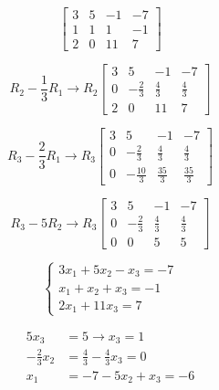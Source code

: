 \documentclass[answers]{exam} %
\begin{document}
\begin{questions}
\begin{enumerate}[label=\alph*.]
		      \begin{solution}
			      \[
				      \left[
					      \begin{array}{ccc|c}
						      3 & 5 & -1 & -7 \\
						      1 & 1 & 1  & -1 \\
						      2 & 0 & 11 & 7
					      \end{array}
					      \right]
			      \]

			      \[
				      R_2 - \frac{1}{3} R_1 \rightarrow R_2
				      \left[
					      \begin{array}{ccc|c}
						      3 & 5            & -1          & -7          \\
						      0 & -\frac{2}{3} & \frac{4}{3} & \frac{4}{3} \\
						      2 & 0            & 11          & 7
					      \end{array}
					      \right]
			      \]

			      \[
				      R_3 - \frac{2}{3} R_1 \rightarrow R_3
				      \left[
					      \begin{array}{ccc|c}
						      3 & 5             & -1           & -7           \\
						      0 & -\frac{2}{3}  & \frac{4}{3}  & \frac{4}{3}  \\
						      0 & -\frac{10}{3} & \frac{35}{3} & \frac{35}{3}
					      \end{array}
					      \right]
			      \]

			      \[
				      R_3 - 5 R_2 \rightarrow R_3
				      \left[
					      \begin{array}{ccc|c}
						      3 & 5            & -1          & -7          \\
						      0 & -\frac{2}{3} & \frac{4}{3} & \frac{4}{3} \\
						      0 & 0            & 5           & 5
					      \end{array}
					      \right]
			      \]

			      \[
				      \begin{cases}
					      3x_1 + 5x_2 - x_3 = -7 \\
					      x_1 + x_2 + x_3 = -1   \\
					      2x_1 + 11x_3 = 7
				      \end{cases}
			      \]

			      \[
				      \begin{aligned}
					      5x_3             & = 5 \rightarrow x_3 = 1            \\
					      -\frac{2}{3} x_2 & = \frac{4}{3} - \frac{4}{3}x_3 = 0 \\
					      x_1              & = -7 - 5x_2 + x_3 = -6
				      \end{aligned}
			      \]


\end{solution}
\end{enumerate}
\end{questions}
\end{document}
